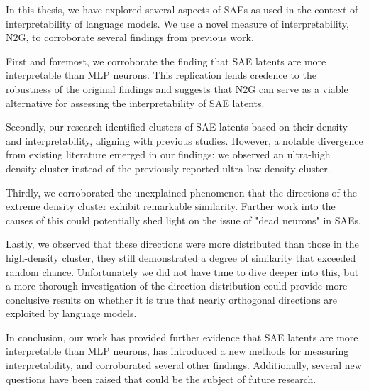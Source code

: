 In this thesis, we have explored several aspects of \acp{SAE} as used in the context of interpretability of language models.
We use a novel measure of interpretability, \ac{N2G}, to corroborate several findings from previous work.

First and foremost, we corroborate the finding that \ac{SAE} latents are more interpretable than \ac{MLP} neurons.
This replication lends credence to the robustness of the original findings and suggests that \ac{N2G} can serve as a viable alternative for assessing the interpretability of \ac{SAE} latents.

Secondly, our research identified clusters of \ac{SAE} latents based on their density and interpretability, aligning with previous studies.
However, a notable divergence from existing literature emerged in our findings: we observed an ultra-high density cluster instead of the previously reported ultra-low density cluster. 

Thirdly, we corroborated the unexplained phenomenon that the directions of the extreme density cluster exhibit remarkable similarity.
Further work into the causes of this could potentially shed light on the issue of "dead neurons" in \acp{SAE}.

Lastly, we observed that these directions were more distributed than those in the high-density cluster, they still demonstrated a degree of similarity that exceeded random chance.
Unfortunately we did not have time to dive deeper into this, but a more thorough investigation of the direction distribution could provide more conclusive results on whether it is true that nearly orthogonal directions are exploited by language models.

In conclusion, our work has provided further evidence that \ac{SAE} latents are more interpretable than \ac{MLP} neurons, has introduced a new methods for measuring interpretability, and corroborated several other findings.
Additionally, several new questions have been raised that could be the subject of future research.

